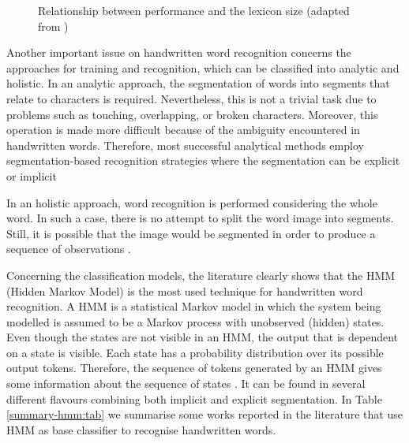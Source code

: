 \documentclass{article}[14pt, oneside, a4paper, times]
\begin{document}
\begin{figure}[htbp]
   \centering
   \caption{Relationship between performance and the lexicon size (adapted from \cite{Koerich2005})}
   \label{fig:lexicon}
\end{figure}

Another important issue on handwritten word recognition concerns the approaches for training and recognition, which can be classified into analytic and holistic.  In an analytic approach, the segmentation of words into segments that relate to characters is required. Nevertheless, this is not a trivial task due to problems such as touching, overlapping, or broken characters. Moreover, this operation is made more difficult because of the ambiguity encountered in handwritten words. Therefore, most successful analytical methods employ segmentation-based recognition strategies where the segmentation can be explicit \cite{Arika2002, Kundu2002, ElYacoubi99, Grandidier01} or implicit \cite{Cho95, Gillies92, Mohamed96}

In an holistic approach, word recognition is performed considering the whole word. In such a case, there is no attempt to split the word image into segments. Still, it is possible that the image would be segmented in order to produce a sequence of observations \cite{Han97,Dimauro97}. 

Concerning the classification models, the literature clearly shows that the HMM (Hidden Markov Model) is the most used technique for handwritten word recognition. A HMM is a statistical Markov model in which the system being modelled is assumed to be a Markov process with unobserved (hidden) states. Even though the states are not visible in an HMM, the output that is dependent on a state is visible. Each state has a probability distribution over its possible output tokens. Therefore, the sequence of tokens generated by an HMM gives some information about the sequence of states \cite{Rabiner89,Jelinek97}.
It can be found in several different flavours combining both implicit and explicit segmentation. In Table \ref{summary-hmm:tab} we summarise some works reported in the literature that use HMM as base classifier to recognise handwritten words. 
\end{document}

